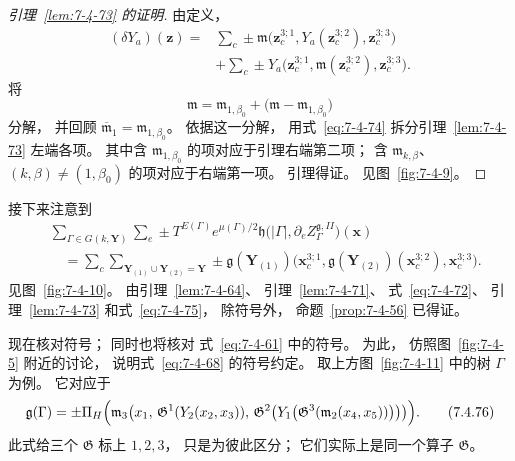 
\begin{proof}[引理~\ref{lem:7-4-73} 的证明]
由定义，
\begin{equation}
\begin{aligned}
(\delta Y_a)(\mathbf z)
={}&
\sum_c\pm
\mathfrak m\bigl(
\mathbf z_c^{3;1},
Y_a(\mathbf z_c^{3;2}),
\mathbf z_c^{3;3}
\bigr)\\
&+
\sum_c\pm
Y_a\bigl(
\mathbf z_c^{3;1},
\mathfrak m(\mathbf z_c^{3;2}),
\mathbf z_c^{3;3}
\bigr).
\end{aligned}
\tag{7.4.74}\label{eq:7-4-74}
\end{equation}
将
\[
\mathfrak m
=\mathfrak m_{1,\beta_0}
+\bigl(\mathfrak m-\mathfrak m_{1,\beta_0}\bigr)
\]
分解，
并回顾
$\overline{\mathfrak m}_1
=\mathfrak m_{1,\beta_0}$。
依据这一分解，
用式~\eqref{eq:7-4-74}
拆分引理~\ref{lem:7-4-73}
左端各项。
其中含
$\mathfrak m_{1,\beta_0}$
的项对应于引理右端第二项；
含
$\mathfrak m_{k,\beta}$、
$(k,\beta)\ne(1,\beta_0)$
的项对应于右端第一项。
引理得证。
见图~\ref{fig:7-4-9}。
\end{proof}


接下来注意到
\begin{equation}
\begin{aligned}
&\sum_{\Gamma\in G(k,\mathbf Y)}
\sum_e
\pm T^{E(\Gamma)}e^{\mu(\Gamma)/2}
\mathfrak h\bigl(
|\Gamma|,
\partial_e Z_\Gamma^{\mathfrak g,II}
\bigr)(\mathbf x)\\
&\quad=
\sum_c
\sum_{\mathbf Y_{(1)}
\cup\mathbf Y_{(2)}=\mathbf Y}
\pm
\mathfrak g(\mathbf Y_{(1)})
\bigl(
\mathbf x_c^{3;1},
\mathfrak g(\mathbf Y_{(2)})
(\mathbf x_c^{3;2}),
\mathbf x_c^{3;3}
\bigr).
\end{aligned}
\tag{7.4.75}\label{eq:7-4-75}
\end{equation}
见图~\ref{fig:7-4-10}。
由引理~\ref{lem:7-4-64}、
引理~\ref{lem:7-4-71}、
式~\eqref{eq:7-4-72}、
引理~\ref{lem:7-4-73}
和式~\eqref{eq:7-4-75}，
除符号外，
命题~\ref{prop:7-4-56}
已得证。


现在核对符号；
同时也将核对
式~\eqref{eq:7-4-61}
中的符号。
为此，
仿照图~\ref{fig:7-4-5}
附近的讨论，
说明式~\eqref{eq:7-4-68}
的符号约定。
取上方图~\ref{fig:7-4-11}
中的树 $\Gamma$ 为例。
它对应于
\begin{equation}
\begin{aligned}
\mathfrak g(\Gamma)
=\pm\Pi_H\Bigl(
\mathfrak m_3\bigl(
x_1,\,
\mathfrak G^1(Y_2(x_2,x_3)),\,
\mathfrak G^2\bigl(
Y_1\bigl(
\mathfrak G^3(
\mathfrak m_2(x_4,x_5))
\bigr)
\bigr)
\bigr)
\Bigr).
\end{aligned}
\tag{7.4.76}\label{eq:7-4-76}
\end{equation}
此式给三个
$\mathfrak G$ 标上
$1,2,3$，
只是为彼此区分；
它们实际上是同一个算子
$\mathfrak G$。

